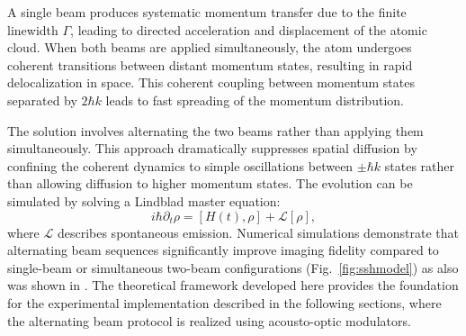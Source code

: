 A single beam produces systematic momentum transfer due to the finite linewidth $\Gamma$, leading to directed acceleration and displacement of the atomic cloud. When both beams are applied simultaneously, the atom undergoes coherent transitions between distant momentum states, resulting in rapid delocalization in space. This coherent coupling between momentum states separated by $2\hbar k$ leads to fast spreading of the momentum distribution.

The solution involves alternating the two beams rather than applying them simultaneously. This approach dramatically suppresses spatial diffusion by confining the coherent dynamics to simple oscillations between $\pm\hbar k$ states rather than allowing diffusion to higher momentum states. The evolution can be simulated by solving a Lindblad master equation:
\begin{equation}
i\hbar \partial_t \rho = [H(t), \rho] + \mathcal{L}[\rho],
\end{equation}
where $\mathcal{L}$ describes spontaneous emission. Numerical simulations demonstrate that alternating beam sequences significantly improve imaging fidelity compared to single-beam or simultaneous two-beam configurations (Fig.~\ref{fig:sshmodel}) as also was shown in \cite{su_fast_2025,bergschneider_spin-resolved_2018}.
The theoretical framework developed here provides the foundation for the experimental implementation described in the following sections, where the alternating beam protocol is realized using acousto-optic modulators.